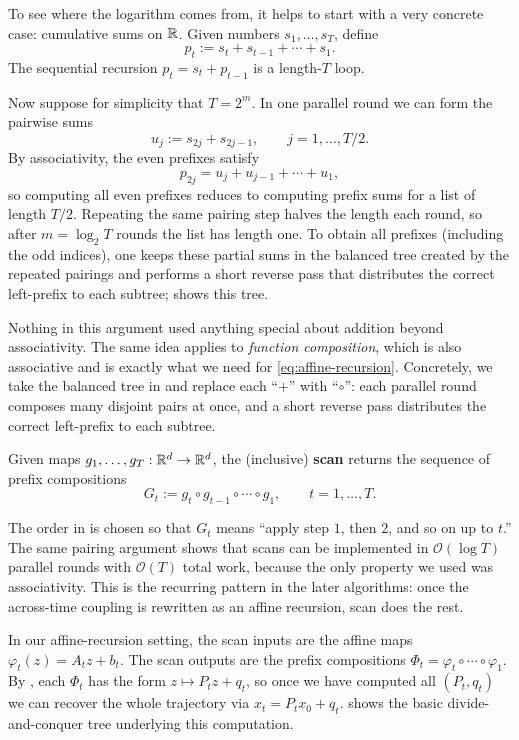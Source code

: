 \documentclass[11pt]{article}
\begin{document}
To see where the logarithm comes from, it helps to start with a very concrete case: cumulative sums on $\mathbb{R}$.
Given numbers $s_1,\dots,s_T$, define
\[
p_t := s_t + s_{t-1} + \cdots + s_1.
\]
The sequential recursion $p_t=s_t+p_{t-1}$ is a length-$T$ loop.

Now suppose for simplicity that $T=2^m$.
In one parallel round we can form the pairwise sums
\[
u_j := s_{2j}+s_{2j-1}, \qquad j=1,\dots,T/2.
\]
By associativity, the even prefixes satisfy
\[
p_{2j}=u_j+u_{j-1}+\cdots+u_1,
\]
so computing all even prefixes reduces to computing prefix sums for a list of length $T/2$.
Repeating the same pairing step halves the length each round, so after $m=\log_2 T$ rounds the list has length one.
To obtain all prefixes (including the odd indices), one keeps these partial sums in the balanced tree created by the repeated pairings and performs a short reverse pass that distributes the correct left-prefix to each subtree;  shows this tree.

Nothing in this argument used anything special about addition beyond associativity.
The same idea applies to \emph{function composition}, which is also associative and is exactly what we need for \eqref{eq:affine-recursion}.
Concretely, we take the balanced tree in  and replace each ``$+$'' with ``$\circ$'': each parallel round composes many disjoint pairs at once, and a short reverse pass distributes the correct left-prefix to each subtree.

\begin{definition}
\label{def:scan}
Given maps $g_1,\dots,g_T:\mathbb{R}^d\to\mathbb{R}^d$, the (inclusive) \textbf{scan} returns the sequence of prefix compositions
\[
G_t := g_t \circ g_{t-1} \circ \cdots \circ g_1,
\qquad t=1,\dots,T.
\]
\end{definition}

The order in  is chosen so that $G_t$ means “apply step $1$, then $2$, and so on up to $t$.”%
The same pairing argument shows that scans can be implemented in $\mathcal{O}(\log T)$ parallel rounds with $\mathcal{O}(T)$ total work, because the only property we used was associativity.
This is the recurring pattern in the later algorithms: once the across-time coupling is rewritten as an affine recursion, scan does the rest.

In our affine-recursion setting, the scan inputs are the affine maps $\varphi_t(z)=A_t z+b_t$.
The scan outputs are the prefix compositions $\Phi_t=\varphi_t\circ\cdots\circ\varphi_1$.
By , each $\Phi_t$ has the form $z\mapsto P_t z+q_t$, so once we have computed all $(P_t,q_t)$ we can recover the whole trajectory via $x_t=P_t x_0+q_t$.
 shows the basic divide-and-conquer tree underlying this computation.%
\end{document}
